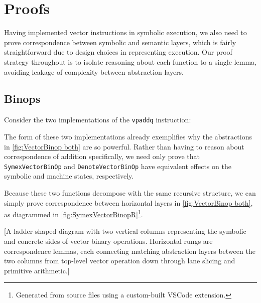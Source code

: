 \chapter{Proofs}
\label{ch:Proofs}

Having implemented vector instructions in symbolic execution, we also need to prove correspondence between symbolic and semantic layers, which is fairly straightforward due to design choices in representing execution. Our proof strategy throughout is to isolate reasoning about each function to a single lemma, avoiding leakage of complexity between abstraction layers. 


\section{Binops}

Consider the two implementations of the \texttt{vpaddq} instruction:


\vspace{-1em}


The form of these two implementations already exemplifies why the abstractions in \autoref{fig:VectorBinop both} are so powerful. Rather than having to reason about correspondence of addition specifically, we need only prove that \texttt{SymexVectorBinOp} and \texttt{DenoteVectorBinOp} have equivalent effects on the symbolic and machine states, respectively. 

Because these two functions decompose with the same recursive structure, we can simply prove correspondence between horizontal layers in \autoref{fig:VectorBinop both}, as diagrammed in \autoref{fig:SymexVectorBinopR}\footnote{Generated from source files using a custom-built VSCode extension.}.

[A ladder-shaped diagram with two vertical columns representing the symbolic and concrete sides of vector binary operations. Horizontal rungs are correspondence lemmas, each connecting matching abstraction layers between the two columns from top-level vector operation down through lane slicing and primitive arithmetic.]
  
